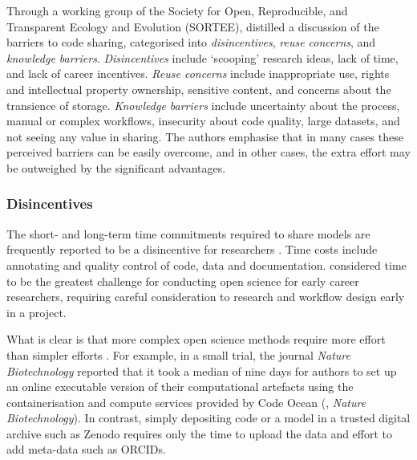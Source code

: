\documentclass[]{interact}
\theoremstyle{plain}%
\theoremstyle{definition}
\theoremstyle{remark}
\begin{document}
Through a working group of the Society for Open, Reproducible, and Transparent Ecology and Evolution (SORTEE), \cite{gomes2022don} distilled a discussion of the barriers to code sharing, categorised into \textit{disincentives}, \textit{reuse concerns}, and \textit{knowledge barriers}. \textit{Disincentives} include `scooping' research ideas, lack of time, and lack of career incentives. \textit{Reuse concerns} include inappropriate use, rights and intellectual property ownership, sensitive content, and concerns about the transience of storage. \textit{Knowledge barriers} include uncertainty about the process, manual or complex workflows, insecurity about code quality, large datasets, and not seeing any value in sharing. The authors emphasise that in many cases these perceived barriers can be easily overcome, and in other cases, the extra effort may be outweighed by the significant advantages.  

\subsubsection{Disincentives}
The short- and long-term time commitments required to share models are frequently reported to be a disincentive for researchers \citep{rrepo24866, hrynaszkiewicz2021survey, gomes2022don}. Time costs include annotating and quality control of code, data and documentation. \cite{Allen2019} considered time to be the greatest challenge for conducting open science for early career researchers, requiring careful consideration to research and workflow design early in a project. 


What is clear is that more complex open science methods require more effort than simpler efforts \citep{monks2023computer, harper_monks_2023_framework, harper_monks_manzi_2023}. For example, in a small trial, the journal \textit{Nature Biotechnology} reported that it took a median of nine days for authors to set up an online executable version of their computational artefacts using the containerisation and compute services provided by Code Ocean (\cite{nature_bio_changing_2019}, \textit{Nature Biotechnology}).  In contrast, simply depositing code or a model in a trusted digital archive such as Zenodo requires only the time to upload the data and effort to add meta-data such as ORCIDs. 
\end{document}
